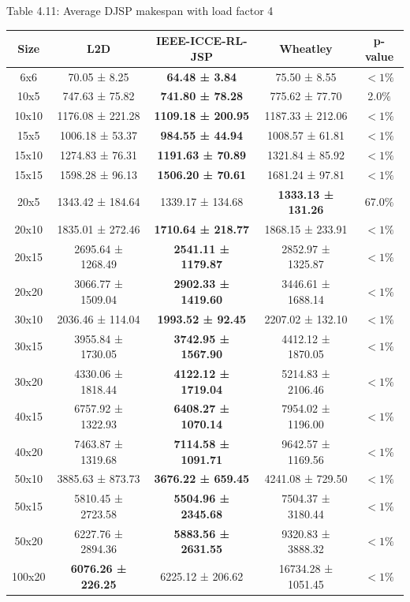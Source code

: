 \begin{table}
    Table 4.11: Average DJSP makespan with load factor 4\\
    \vspace{1mm}
    \label{table:4.8}
    \footnotesize 
    \begin{tabular}{ccccc}
    \toprule
    Size & L2D & IEEE-ICCE-RL-JSP & Wheatley & p-value \\
    \midrule
    6x6 & 70.05 ± 8.25 & \textbf{64.48 ± 3.84} & 75.50 ± 8.55 & $< 1\%$ \\
    10x5 & 747.63 ± 75.82 & \textbf{741.80 ± 78.28} & 775.62 ± 77.70 & 2.0$\%$ \\
    10x10 & 1176.08 ± 221.28 & \textbf{1109.18 ± 200.95} & 1187.33 ± 212.06 & $< 1\%$ \\
    15x5 & 1006.18 ± 53.37 & \textbf{984.55 ± 44.94} & 1008.57 ± 61.81 & $< 1\%$ \\
    15x10 & 1274.83 ± 76.31 & \textbf{1191.63 ± 70.89} & 1321.84 ± 85.92 & $< 1\%$ \\
    15x15 & 1598.28 ± 96.13 & \textbf{1506.20 ± 70.61} & 1681.24 ± 97.81 & $< 1\%$ \\
    20x5 & 1343.42 ± 184.64 & 1339.17 ± 134.68 & \textbf{1333.13 ± 131.26} & 67.0$\%$ \\
    20x10 & 1835.01 ± 272.46 & \textbf{1710.64 ± 218.77} & 1868.15 ± 233.91 & $< 1\%$ \\
    20x15 & 2695.64 ± 1268.49 & \textbf{2541.11 ± 1179.87} & 2852.97 ± 1325.87 & $< 1\%$ \\
    20x20 & 3066.77 ± 1509.04 & \textbf{2902.33 ± 1419.60} & 3446.61 ± 1688.14 & $< 1\%$ \\
    30x10 & 2036.46 ± 114.04 & \textbf{1993.52 ± 92.45} & 2207.02 ± 132.10 & $< 1\%$ \\
    30x15 & 3955.84 ± 1730.05 & \textbf{3742.95 ± 1567.90} & 4412.12 ± 1870.05 & $< 1\%$ \\
    30x20 & 4330.06 ± 1818.44 & \textbf{4122.12 ± 1719.04} & 5214.83 ± 2106.46 & $< 1\%$ \\
    40x15 & 6757.92 ± 1322.93 & \textbf{6408.27 ± 1070.14} & 7954.02 ± 1196.00 & $< 1\%$ \\
    40x20 & 7463.87 ± 1319.68 & \textbf{7114.58 ± 1091.71} & 9642.57 ± 1169.56 & $< 1\%$ \\
    50x10 & 3885.63 ± 873.73 & \textbf{3676.22 ± 659.45} & 4241.08 ± 729.50 & $< 1\%$ \\
    50x15 & 5810.45 ± 2723.58 & \textbf{5504.96 ± 2345.68} & 7504.37 ± 3180.44 & $< 1\%$ \\
    50x20 & 6227.76 ± 2894.36 & \textbf{5883.56 ± 2631.55} & 9320.83 ± 3888.32 & $< 1\%$ \\
    100x20 & \textbf{6076.26 ± 226.25} & 6225.12 ± 206.62 & 16734.28 ± 1051.45 & $< 1\%$ \\
    \bottomrule
    \end{tabular}
\end{table}
    
